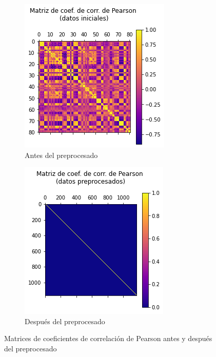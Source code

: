 \documentclass[10pt,a4paper]{article}
\begin{document}
\begin{figure}[h]
	\begin{subfigure}{0.5\textwidth}
		\centering
		\includegraphics[width=\textwidth]{reg_pearson_antes}
		\caption{Antes del preprocesado}
	\end{subfigure}
	\begin{subfigure}{0.5\textwidth}
		\centering
		\includegraphics[width=\textwidth]{reg_pearson_despues}
		\caption{Después del preprocesado}
	\end{subfigure}
	\caption{Matrices de coeficientes de correlación de Pearson antes y después del preprocesado}
	\label{fig:reg_pearson}
\end{figure}
\end{document}

